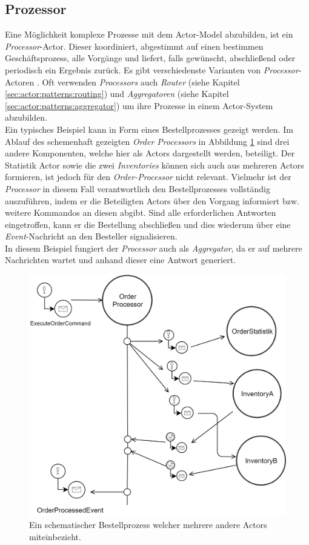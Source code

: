 \subsection{Prozessor}\label{sub:actor:patterns:processor}
Eine Möglichkeit komplexe Prozesse mit dem Actor-Model abzubilden, ist ein \textit{Processor}-Actor. Dieser koordiniert, abgestimmt auf einen bestimmen Geschäftsprozess, alle Vorgänge und liefert, falls gewünscht, abschließend oder periodisch ein Ergebnis zurück. Es gibt verschiedenste Varianten von \textit{Processor}-Actoren \citep{Vernon2015ReactiveAkka}.
Oft verwenden \textit{Processors} auch \textit{Router} (siehe Kapitel \ref{sec:actor:patterns:routing}) und \textit{Aggregatoren} (siehe Kapitel \ref{sec:actor:patterns:aggregator}) um ihre Prozesse in einem Actor-System abzubilden. \\
Ein typisches Beispiel kann in Form eines Bestellprozesses gezeigt werden. Im Ablauf des schemenhaft gezeigten \textit{Order Processors} in Abbildung \ref{fig:actor:patterns:orderProcesseor} sind drei andere Komponenten, welche hier als Actors dargestellt werden, beteiligt. Der Statistik Actor sowie die zwei \textit{Inventories} können sich auch aus mehreren Actors formieren, ist jedoch für den \textit{Order-Processor} nicht relevant. Vielmehr ist der \textit{Processor} in diesem Fall verantwortlich den Bestellprozesses vollständig auszuführen, indem er die Beteiligten Actors über den Vorgang informiert bzw. weitere Kommandos an diesen abgibt. Sind alle erforderlichen Antworten eingetroffen, kann er die Bestellung abschließen und dies wiederum über eine \textit{Event}-Nachricht an den Besteller signalisieren. \\
In diesem Beispiel fungiert der \textit{Processor} auch als \textit{Aggregator}, da er auf mehrere Nachrichten wartet und anhand dieser eine Antwort generiert. 

\begin{figure}
  \centering
  \includegraphics[width=0.9\linewidth]{gfx/actor/patterns/simpleOrderProcesor}
  \caption{Ein schematischer Bestellprozess welcher mehrere andere Actors miteinbezieht.}
  \label{fig:actor:patterns:orderProcesseor}
\end{figure}


